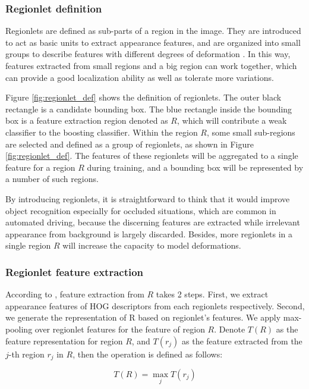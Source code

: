 \documentclass{article} %
\begin{document}
\subsubsection{Regionlet definition}

Regionlets are defined as sub-parts of a region in the image. They are introduced to act as basic units to extract appearance features, and are organized into small groups to describe features with different degrees of deformation \cite{Wang2013}. In this way, features extracted from small regions and a big region can work together, which can provide a good localization ability as well as tolerate more variations.

Figure \ref{fig:regionlet_def} shows the definition of regionlets. The outer black rectangle is a candidate bounding box. The blue rectangle inside the bounding box is a feature extraction region denoted as $R$, which will contribute a weak classifier to the boosting classifier. Within the region $R$, some small sub-regions are selected and defined as a group of regionlets, as shown in Figure \ref{fig:regionlet_def}. The features of these regionlets will be aggregated to a single feature for a region $R$ during training, and a bounding box will be represented by a number of such regions.

By introducing regionlets, it is straightforward to think that it would improve object recognition especially for occluded situations, which are common in automated driving, because the discerning features are extracted while irrelevant appearance from background is largely discarded. Besides, more regionlets in a single region $R$ will increase the capacity to model deformations.


\subsubsection{Regionlet feature extraction}

According to \cite{Wang2013}, feature extraction from $R$ takes 2 steps. First, we extract appearance features of HOG descriptors \cite{dalal2005histograms} from each regionlets respectively. Second, we generate the representation of R based on regionlet’s features. We apply max-pooling over regionlet features for the feature of region $R$. Denote $T(R)$ as the feature representation for region $R$, and $T(r_j)$ as the feature extracted from the $j$-th region $r_j$ in $R$, then the operation is defined as follows:

\begin{equation}
T(R) = \max \limits_j T(r_j)
\end{equation}
\end{document}
